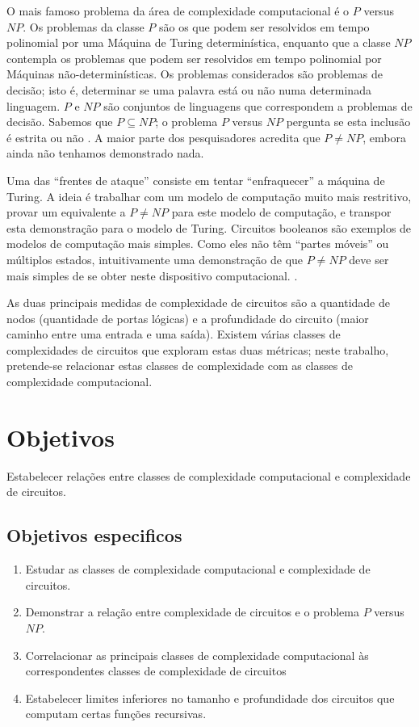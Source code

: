 \documentclass[12pt]{article}
\begin{document}
    O mais famoso problema da área de complexidade computacional é o $P$ versus $NP$.
    Os problemas da classe $P$ são os que podem ser resolvidos em tempo polinomial
    por uma Máquina de Turing determinística, enquanto que a classe $NP$ contempla
    os problemas que podem ser resolvidos em tempo polinomial por Máquinas
    não-determinísticas.
    Os problemas considerados são problemas de decisão; isto é, determinar se uma
    palavra está ou não numa determinada linguagem. $P$ e $NP$ são conjuntos de
    linguagens que correspondem a problemas de decisão. Sabemos que $P \subseteq NP$;
    o problema $P$ versus $NP$ pergunta se esta inclusão é estrita ou não \cite{Sipser2006}.
    A maior parte dos pesquisadores acredita que $P \neq NP$,
    embora ainda não tenhamos demonstrado nada.

    Uma das ``frentes de ataque'' consiste em tentar ``enfraquecer'' a máquina de Turing.
    A ideia é trabalhar com um modelo de computação muito mais restritivo,
    provar um equivalente a $P \neq NP$ para este modelo de computação,
    e transpor esta demonstração para o modelo de Turing.
    Circuitos booleanos são exemplos de modelos de computação mais simples.
    Como eles não têm ``partes móveis'' ou múltiplos estados,
    intuitivamente uma demonstração de que $P \neq NP$ deve ser
    mais simples de se obter neste dispositivo computacional. \cite{Hastad1987}.

    As duas principais medidas de complexidade de circuitos são a quantidade de
    nodos (quantidade de portas lógicas) e a profundidade do circuito
    (maior caminho entre uma entrada e uma saída).
    Existem várias classes de complexidades de circuitos
    que exploram estas duas métricas;
    neste trabalho, pretende-se relacionar estas classes de complexidade
    com as classes de complexidade computacional.

\section{Objetivos}

    Estabelecer relações entre classes de complexidade computacional
    e complexidade de circuitos.

\subsection{Objetivos especificos}

    \begin{enumerate}
        \item Estudar as classes de complexidade computacional
            e complexidade de circuitos.
        \item Demonstrar a relação entre complexidade de circuitos
            e o problema $P$ versus $NP$.
        \item Correlacionar as principais classes de complexidade computacional
            às correspondentes classes de complexidade de circuitos
        \item Estabelecer limites inferiores no tamanho e profundidade dos circuitos
            que computam certas funções recursivas.
    \end{enumerate}
\end{document}
